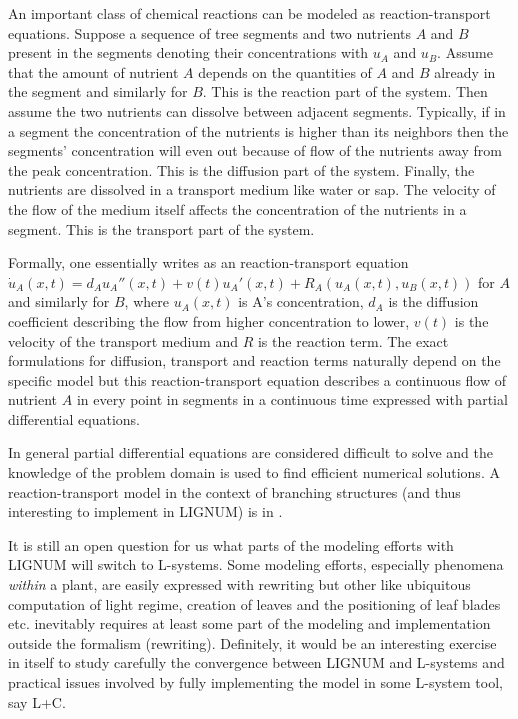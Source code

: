An  important   class  of  chemical   reactions  can  be   modeled  as
reaction-transport equations. Suppose a  sequence of tree segments and
two  nutrients $A$  and $B$  present  in the  segments denoting  their
concentrations  with  $u_A$ and  $u_B$.   Assume  that  the amount  of
nutrient $A$ depends  on the quantities of $A$ and  $B$ already in the
segment  and similarly  for $B$.   This is  the reaction  part  of the
system. Then  assume the two  nutrients can dissolve  between adjacent
segments.   Typically,  if  in  a  segment the  concentration  of  the
nutrients   is  higher   than   its  neighbors   then  the   segments'
concentration will even out because of flow of the nutrients away from
the peak  concentration.  This  is the diffusion  part of  the system.
Finally, the nutrients are dissolved  in a transport medium like water
or sap.   The velocity of  the flow of  the medium itself  affects the
concentration of  the nutrients in  a segment.  This is  the transport
part of the system.

Formally,  one essentially  writes as  an  reaction-transport equation
$\dot{u}_A(x,t)     =      d_Au_A''(x,t)     +     v(t)u_A'(x,t)     +
R_A(u_A(x,t),u_B(x,t))$   for  $A$  and   similarly  for   $B$,  where
$u_A(x,t)$ is  A's concentration,  $d_A$ is the  diffusion coefficient
describing the flow from higher  concentration to lower, $v(t)$ is the
velocity of  the transport medium and  $R$ is the  reaction term.  The
exact  formulations  for   diffusion,  transport  and  reaction  terms
naturally  depend on  the specific  model but  this reaction-transport
equation describes a continuous flow of nutrient $A$ in every point in
segments  in a  continuous  time expressed  with partial  differential
equations.

In general partial differential  equations are considered difficult to
solve  and  the  knowledge of  the  problem  domain  is used  to  find
efficient  numerical  solutions.  A  reaction-transport  model in  the
context of branching structures  (and thus interesting to implement in
LIGNUM) is in \citet{palovaara:03}.

It is still an open question for us what parts of the modeling efforts
with  LIGNUM  will  switch   to  L-systems.   Some  modeling  efforts,
especially phenomena  {\it within} a plant, are  easily expressed with
rewriting  but  other like  ubiquitous  computation  of light  regime,
creation of leaves and the positioning of leaf blades etc.  inevitably
requires at least some part of the modeling and implementation outside
the  formalism (rewriting).   Definitely, it  would be  an interesting
exercise in  itself to study carefully the  convergence between LIGNUM
and  L-systems and  practical  issues involved  by fully  implementing
the model in some L-system tool, say L+C.

